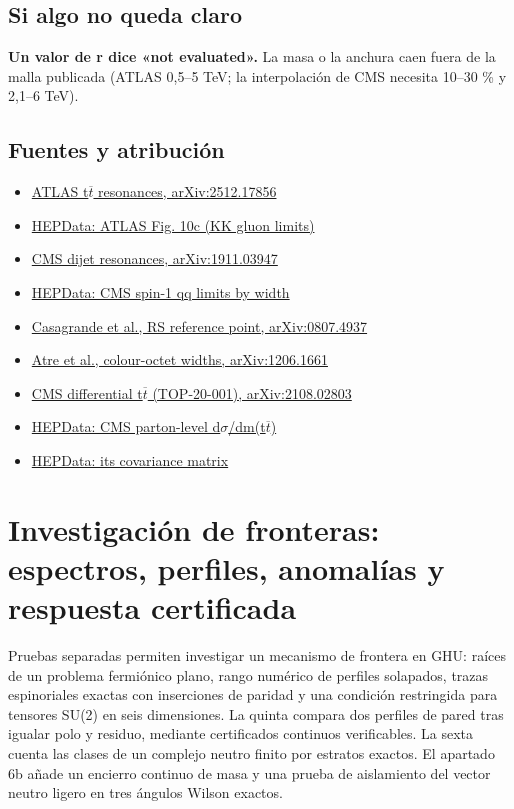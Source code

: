 \documentclass[11pt,a4paper]{article}
\begin{document}
\subsection*{Si algo no queda claro}
\textbf{Un valor de r dice «not evaluated».} La masa o la anchura caen fuera de la malla publicada (ATLAS 0,5--5 TeV; la interpolación de CMS necesita 10--30 \% y 2,1--6 TeV).

\subsection*{Fuentes y atribución}
\begin{itemize}
\item \href{https://arxiv.org/abs/2512.17856}{ATLAS t\ensuremath{\overline{t}} resonances, arXiv:2512.17856}
\item \href{https://doi.org/10.17182/hepdata.168229.v1/t15}{HEPData: ATLAS Fig. 10c (KK gluon limits)}
\item \href{https://arxiv.org/abs/1911.03947}{CMS dijet resonances, arXiv:1911.03947}
\item \href{https://doi.org/10.17182/hepdata.91059.v1/t10}{HEPData: CMS spin-1 qq limits by width}
\item \href{https://arxiv.org/abs/0807.4937}{Casagrande et al., RS reference point, arXiv:0807.4937}
\item \href{https://arxiv.org/abs/1206.1661}{Atre et al., colour-octet widths, arXiv:1206.1661}
\item \href{https://arxiv.org/abs/2108.02803}{CMS differential t\ensuremath{\overline{t}} (TOP-20-001), arXiv:2108.02803}
\item \href{https://doi.org/10.17182/hepdata.102956.v1/t37}{HEPData: CMS parton-level d\ensuremath{\sigma}/dm(t\ensuremath{\overline{t}})}
\item \href{https://doi.org/10.17182/hepdata.102956.v1/t38}{HEPData: its covariance matrix}
\end{itemize}
\section{Investigación de fronteras: espectros, perfiles, anomalías y respuesta certificada}
Pruebas separadas permiten investigar un mecanismo de frontera en GHU: raíces de un problema fermiónico plano, rango numérico de perfiles solapados, trazas espinoriales exactas con inserciones de paridad y una condición restringida para tensores SU(2) en seis dimensiones. La quinta compara dos perfiles de pared tras igualar polo y residuo, mediante certificados continuos verificables. La sexta cuenta las clases de un complejo neutro finito por estratos exactos. El apartado 6b añade un encierro continuo de masa y una prueba de aislamiento del vector neutro ligero en tres ángulos Wilson exactos.
\end{document}
